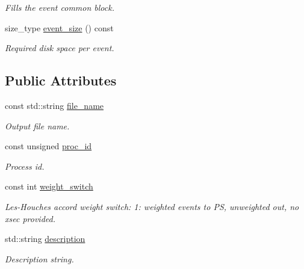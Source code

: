 \begin{DoxyCompactItemize}
\begin{DoxyCompactList}\small\item\em Fills the event common block. \end{DoxyCompactList}\item 
\hypertarget{a00323_aab8e06d09a764122a89115144a83fb44}{size\-\_\-type \hyperlink{a00323_aab8e06d09a764122a89115144a83fb44}{event\-\_\-size} () const }\label{a00323_aab8e06d09a764122a89115144a83fb44}

\begin{DoxyCompactList}\small\item\em Required disk space per event. \end{DoxyCompactList}\end{DoxyCompactItemize}
\subsection*{Public Attributes}
\begin{DoxyCompactItemize}
\item 
\hypertarget{a00323_ab375d56ae94afa6c5c27a5e5f937ec44}{const std\-::string \hyperlink{a00323_ab375d56ae94afa6c5c27a5e5f937ec44}{file\-\_\-name}}\label{a00323_ab375d56ae94afa6c5c27a5e5f937ec44}

\begin{DoxyCompactList}\small\item\em Output file name. \end{DoxyCompactList}\item 
\hypertarget{a00323_a0768f1718ffaebf200b096efd5297fd4}{const unsigned \hyperlink{a00323_a0768f1718ffaebf200b096efd5297fd4}{proc\-\_\-id}}\label{a00323_a0768f1718ffaebf200b096efd5297fd4}

\begin{DoxyCompactList}\small\item\em Process id. \end{DoxyCompactList}\item 
const int \hyperlink{a00323_a067bf1d9ce6ef519da53c80d422b89dd}{weight\-\_\-switch}
\begin{DoxyCompactList}\small\item\em Les-\/\-Houches accord weight switch\-: 1\-: weighted events to P\-S, unweighted out, no xsec provided. \end{DoxyCompactList}\item 
\hypertarget{a00323_ac99556b033add683c6699d01af862cf9}{std\-::string \hyperlink{a00323_ac99556b033add683c6699d01af862cf9}{description}}\label{a00323_ac99556b033add683c6699d01af862cf9}

\begin{DoxyCompactList}\small\item\em Description string. \end{DoxyCompactList}\end{DoxyCompactItemize}
